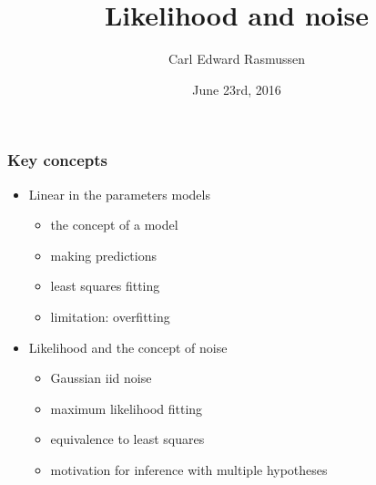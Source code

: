 

\title{Likelihood and noise}
\author{Carl Edward Rasmussen}
\date{June 23rd, 2016}



\begin{frame}
\titlepage
\end{frame}

\begin{frame}
\frametitle{Key concepts}
\begin{itemize}
\item Linear in the parameters models
\begin{itemize}
\item the concept of a model
\item making predictions
\item least squares fitting
\item limitation: overfitting
\end{itemize}
\item Likelihood and the concept of noise
\begin{itemize}
\item Gaussian iid noise
\item maximum likelihood fitting
\item equivalence to least squares
\item motivation for inference with multiple hypotheses
\end{itemize}
\end{itemize}
\end{frame}

